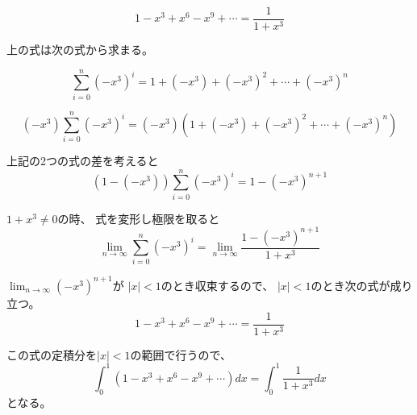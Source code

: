 \documentclass[12pt,b5paper]{ltjsarticle}
\begin{document}
\begin{equation}
 1-x^3+x^6-x^9+ \cdots
 =  \frac{1}{1+x^3}
\end{equation}

上の式は次の式から求まる。

\begin{equation}
 \sum_{i=0}^n (-x^3)^i =
 1+(-x^3)+(-x^3)^2+\cdots + (-x^3)^n
\end{equation}

\begin{equation}
 (-x^3)\sum_{i=0}^n (-x^3)^i =
 (-x^3)(1+(-x^3)+(-x^3)^2+\cdots + (-x^3)^n)
\end{equation}

上記の2つの式の差を考えると
\begin{equation}
 (1-(-x^3))\sum_{i=0}^n (-x^3)^i =
 1 - (-x^3)^{n+1}
\end{equation}

$1+x^3 \ne 0$の時、
式を変形し極限を取ると
\begin{equation}
 \lim_{n\rightarrow\infty}\sum_{i=0}^n (-x^3)^i =
 \lim_{n\rightarrow\infty}\frac{1 - (-x^3)^{n+1}}{1+x^3}
\end{equation}


$\lim_{n\rightarrow\infty}(-x^3)^{n+1}$が
$|x|<1$のとき収束するので、
$|x|<1$のとき次の式が成り立つ。
\begin{equation}
 1-x^3+x^6-x^9+ \cdots
 = \frac{1}{1+x^3}
\end{equation}

この式の定積分を$|x|<1$の範囲で行うので、
\begin{equation}
 \int_0^1(1-x^3+x^6-x^9+ \cdots)dx
  = \int_0^1\frac{1}{1+x^3}dx
\end{equation}
となる。
\end{document}
